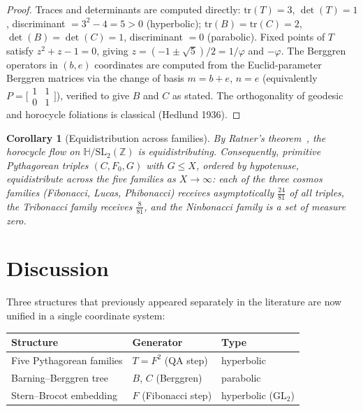 \documentclass[12pt]{article}
\newtheorem{corollary}[theorem]{Corollary}
\begin{document}
\begin{proof}
Traces and determinants are computed directly:
$\mathrm{tr}(T)=3$, $\det(T)=1$, discriminant $=3^2-4=5>0$ (hyperbolic);
$\mathrm{tr}(B)=\mathrm{tr}(C)=2$, $\det(B)=\det(C)=1$, discriminant $=0$ (parabolic).
Fixed points of $T$ satisfy $z^2+z-1=0$, giving $z=(-1\pm\sqrt{5})/2=1/\varphi$ and $-\varphi$.
The Berggren operators in $(b,e)$ coordinates are computed from the Euclid-parameter
Berggren matrices via the change of basis $m=b+e$, $n=e$ (equivalently $P=\bigl[\begin{smallmatrix}1&1\\0&1\end{smallmatrix}\bigr]$),
verified to give $B$ and $C$ as stated.
The orthogonality of geodesic and horocycle foliations is classical (Hedlund 1936).
\end{proof}

\begin{corollary}[Equidistribution across families]
By Ratner's theorem~\cite{ratner}, the horocycle flow on $\mathbb{H}/\mathrm{SL}_2(\mathbb{Z})$
is equidistributing.  Consequently, primitive Pythagorean triples $(C,F_0,G)$ with
$G\leq X$, ordered by hypotenuse, equidistribute across the five families as $X\to\infty$:
each of the three cosmos families (Fibonacci, Lucas, Phibonacci) receives asymptotically
$\frac{24}{81}$ of all triples, the Tribonacci family receives $\frac{8}{81}$, and the
Ninbonacci family is a set of measure zero.
\end{corollary}

\section{Discussion}

Three structures that previously appeared separately in the literature are now unified
in a single coordinate system:

\begin{center}
\begin{tabular}{lll}
\toprule
Structure & Generator & Type \\
\midrule
Five Pythagorean families & $T=F^2$ (QA step) & hyperbolic \\
Barning--Berggren tree & $B$, $C$ (Berggren) & parabolic \\
Stern--Brocot embedding & $F$ (Fibonacci step) & hyperbolic (GL$_2$) \\
\bottomrule
\end{tabular}
\end{center}
\end{document}
